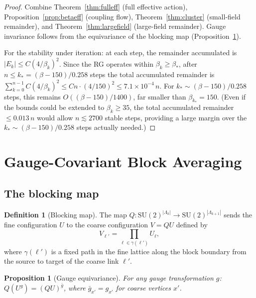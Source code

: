\documentclass[11pt]{article}
\newtheorem{proposition}[theorem]{Proposition}
\theoremstyle{definition}
\newtheorem{definition}[theorem]{Definition}
\newcommand{\SU}{\mathrm{SU}}
\begin{document}
\begin{proof}
Combine Theorem~\ref{thm:fulleff} (full effective action),
Proposition~\ref{prop:betaeff} (coupling flow),
Theorem~\ref{thm:cluster} (small-field remainder), and
Theorem~\ref{thm:largefield} (large-field remainder).
Gauge invariance follows from the equivariance of the blocking map
(Proposition~\ref{prop:equiv}).

For the stability under iteration: at each step, the remainder
accumulated is $|E_k|\le C(4/\beta_k)^2$.  Since the RG operates
within $\beta_k\ge\beta_*$, after $n\le k_*=(\beta-150)/0.258$ steps
the total accumulated remainder is
$\sum_{k=0}^{n-1}C(4/\beta_k)^2\le Cn\cdot(4/150)^2\le 7.1\times 10^{-4}\,n$.
For $k_*\sim(\beta-150)/0.258$ steps, this remains $O((\beta-150)/1400)$,
far smaller than $\beta_{k_*}=150$.  (Even if the bounds could be
extended to $\beta_k\ge 35$, the total accumulated remainder
$\le 0.013\,n$ would allow $n\lesssim 2700$ stable steps, providing
a large margin over the $k_*\sim(\beta-150)/0.258$ steps actually needed.)
\end{proof}

\section{Gauge-Covariant Block Averaging}\label{sec:blocking}

\subsection{The blocking map}

\begin{definition}[Blocking map]\label{def:blockingmap}
The map $Q:\SU(2)^{|\Lambda_k|}\to\SU(2)^{|\Lambda_{k+1}|}$ sends the
fine configuration $U$ to the coarse configuration $V=QU$ defined by
\begin{equation}
V_{\ell'}=\prod_{\ell\in\gamma(\ell')}U_\ell,
\end{equation}
where $\gamma(\ell')$ is a fixed path in the fine lattice along the
block boundary from the source to target of the coarse link $\ell'$.
\end{definition}

\begin{proposition}[Gauge equivariance]\label{prop:equiv}
For any gauge transformation $g$:
$Q(U^g)=(QU)^{\bar{g}}$, where $\bar{g}_{x'}=g_{x'}$ for coarse
vertices $x'$.
\end{proposition}
\end{document}
